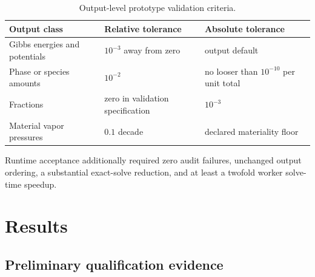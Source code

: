 \documentclass[11pt]{article}
\begin{document}
\begin{table}[htbp]
  \centering
  \caption{Output-level prototype validation criteria.}
  \label{tab:acceptance}
  \begin{tabular}{L{0.42\textwidth}C{0.23\textwidth}C{0.23\textwidth}}
    \toprule
    Output class & Relative tolerance & Absolute tolerance \\
    \midrule
    Gibbs energies and potentials & \(10^{-3}\) away from zero & output default \\
    Phase or species amounts & \(10^{-2}\) & no looser than \(10^{-10}\) per unit total \\
    Fractions & zero in validation specification & \(10^{-3}\) \\
    Material vapor pressures & \(0.1\) decade & declared materiality floor \\
    \bottomrule
  \end{tabular}
\end{table}

Runtime acceptance additionally required zero audit failures, unchanged output ordering, a
substantial exact-solve reduction, and at least a twofold worker solve-time speedup.

\section{Results}

\subsection{Preliminary qualification evidence}
\end{document}
